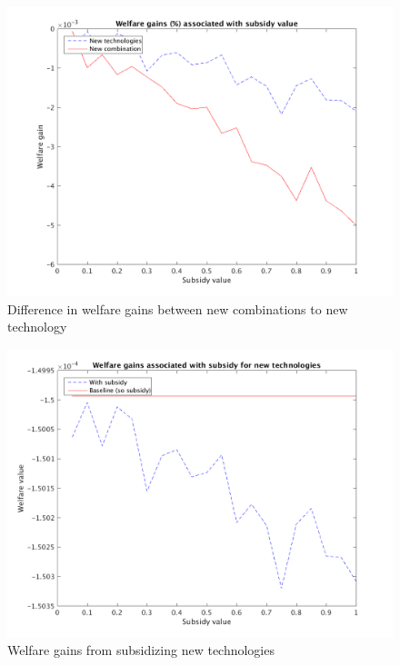 \documentclass[a4paper,11pt]{article}
\begin{document}
\begin{figure}[h!]
\begin{center}
\includegraphics[scale=.8]{figures/Welfare_pp.png}
\caption{Difference in welfare gains between new combinations to new technology}
\end{center}
\end{figure}

\begin{figure}[h!]
\begin{center}
\includegraphics[scale=.8]{figures/Welfare_NT.png}
\caption{Welfare gains from subsidizing new technologies}
\end{center}
\end{figure}
\end{document}
